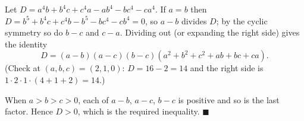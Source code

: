 Let $D=a^4b+b^4c+c^4a-ab^4-bc^4-ca^4$. If $a=b$ then $D=b^5+b^4c+c^4b-b^5-bc^4-cb^4=0$, so $a-b$ divides $D$; by the cyclic symmetry so do $b-c$ and $c-a$. Dividing out (or expanding the right side) gives the identity
\[
D=(a-b)(a-c)(b-c)\left(a^2+b^2+c^2+ab+bc+ca\right).
\]
(Check at $(a,b,c)=(2,1,0)$: $D=16-2=14$ and the right side is $1\cdot2\cdot1\cdot(4+1+2)=14$.)

When $a>b>c>0$, each of $a-b$, $a-c$, $b-c$ is positive and so is the last factor. Hence $D>0$, which is the required inequality. $\blacksquare$
